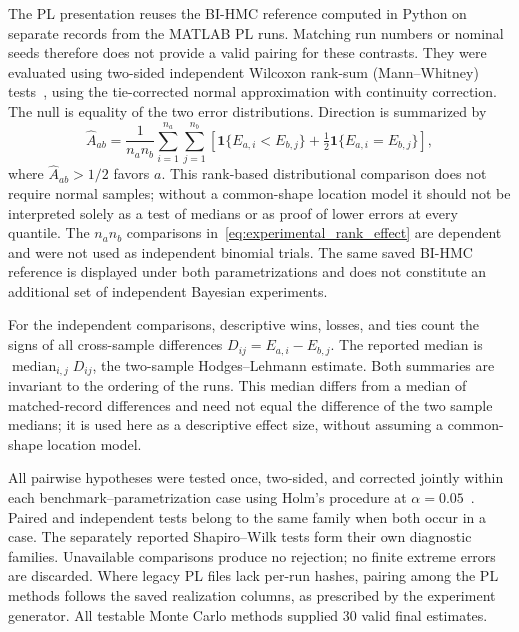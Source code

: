 The PL presentation reuses the BI-HMC reference computed in Python on
separate records from the MATLAB PL runs. Matching run numbers or nominal
seeds therefore does not provide a valid pairing for these contrasts.
They were evaluated using two-sided independent Wilcoxon rank-sum
(Mann--Whitney) tests~\cite{MannWhitney1947}, using the tie-corrected normal
approximation with continuity correction. The null is equality of the
two error distributions. Direction is summarized by
\begin{equation}
 \widehat A_{ab}=\frac{1}{n_a n_b}\sum_{i=1}^{n_a}\sum_{j=1}^{n_b}
 \left[\mathbf{1}\{E_{a,i}<E_{b,j}\}
       +\tfrac12\mathbf{1}\{E_{a,i}=E_{b,j}\}\right],
 \label{eq:experimental_rank_effect}
\end{equation}
where $\widehat A_{ab}>1/2$ favors $a$. This rank-based distributional
comparison does not require normal samples; without a common-shape
location model it should not be interpreted solely as a test of medians
or as proof of lower errors at every quantile. The $n_a n_b$ comparisons
in~\eqref{eq:experimental_rank_effect} are dependent and were not used as
independent binomial trials. The same saved BI-HMC reference is displayed
under both parametrizations and does not constitute an additional set of
independent Bayesian experiments.

For the independent comparisons, descriptive wins, losses, and ties count
the signs of all cross-sample differences $D_{ij}=E_{a,i}-E_{b,j}$.
The reported median is $\operatorname{median}_{i,j}D_{ij}$, the two-sample
Hodges--Lehmann estimate. Both summaries are invariant to the ordering of
the runs. This median differs from a median of matched-record differences
and need not equal the difference of the two sample medians; it is used
here as a descriptive effect size, without assuming a common-shape
location model.

All pairwise hypotheses were tested once, two-sided, and corrected jointly
within each benchmark--parametrization case using Holm's procedure at
$\alpha=0.05$~\cite{Holm1979}. Paired and independent tests belong to the
same family when both occur in a case. The separately reported Shapiro--Wilk
tests form their own diagnostic families. Unavailable comparisons produce
no rejection; no finite extreme errors are discarded. Where legacy PL
files lack per-run hashes, pairing among the PL methods follows the saved
realization columns, as prescribed by the experiment generator. All
testable Monte Carlo methods supplied 30 valid final estimates.

